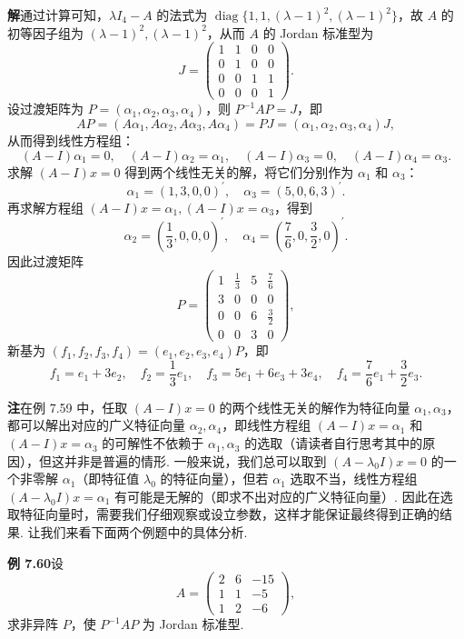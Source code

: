 \documentclass[UTF8, 12pt, fontset=fandol, oneside]{ctexart}
\begin{document}
\noindent\textbf{解}\quad 通过计算可知，$\lambda I_4-A$ 的法式为 $\operatorname{diag}\{1,1,(\lambda-1)^2,(\lambda-1)^2\}$，故 $A$ 的初等因子组为 $(\lambda-1)^2,(\lambda-1)^2$，从而 $A$ 的 Jordan 标准型为
\[
J=\left(\begin{array}{cccc}
1&1&0&0\\
0&1&0&0\\
0&0&1&1\\
0&0&0&1
\end{array}\right).
\]
设过渡矩阵为 $P=(\alpha_1,\alpha_2,\alpha_3,\alpha_4)$，则 $P^{-1}AP=J$，即
\[
AP=(A\alpha_1,A\alpha_2,A\alpha_3,A\alpha_4)=PJ=(\alpha_1,\alpha_2,\alpha_3,\alpha_4)J,
\]
从而得到线性方程组：
\[
(A-I)\alpha_1=0,\quad (A-I)\alpha_2=\alpha_1,\quad (A-I)\alpha_3=0,\quad (A-I)\alpha_4=\alpha_3.
\]
求解 $(A-I)x=0$ 得到两个线性无关的解，将它们分别作为 $\alpha_1$ 和 $\alpha_3$：
\[
\alpha_1=(1,3,0,0)^{\prime},\quad \alpha_3=(5,0,6,3)^{\prime}.
\]
再求解方程组 $(A-I)x=\alpha_1,(A-I)x=\alpha_3$，得到
\[
\alpha_2=\left(\frac13,0,0,0\right)^{\prime},\quad \alpha_4=\left(\frac76,0,\frac32,0\right)^{\prime}.
\]
因此过渡矩阵
\[
P=\left(\begin{array}{cccc}
1&\frac13&5&\frac76\\
3&0&0&0\\
0&0&6&\frac32\\
0&0&3&0
\end{array}\right),
\]
新基为 $(f_1,f_2,f_3,f_4)=(e_1,e_2,e_3,e_4)P$，即
\[
f_1=e_1+3e_2,\quad f_2=\frac13e_1,\quad f_3=5e_1+6e_3+3e_4,\quad f_4=\frac76e_1+\frac32e_3.
\]

\noindent\textbf{注}\quad 在例 7.59 中，任取 $(A-I)x=0$ 的两个线性无关的解作为特征向量 $\alpha_1,\alpha_3$，都可以解出对应的广义特征向量 $\alpha_2,\alpha_4$，即线性方程组 $(A-I)x=\alpha_1$ 和 $(A-I)x=\alpha_3$ 的可解性不依赖于 $\alpha_1,\alpha_3$ 的选取（请读者自行思考其中的原因），但这并非是普遍的情形. 一般来说，我们总可以取到 $(A-\lambda_0I)x=0$ 的一个非零解 $\alpha_1$（即特征值 $\lambda_0$ 的特征向量），但若 $\alpha_1$ 选取不当，线性方程组 $(A-\lambda_0I)x=\alpha_1$ 有可能是无解的（即求不出对应的广义特征向量）. 因此在选取特征向量时，需要我们仔细观察或设立参数，这样才能保证最终得到正确的结果. 让我们来看下面两个例题中的具体分析.

\noindent\textbf{例 7.60}\quad 设
\[
A=\left(\begin{array}{rrr}
2&6&-15\\
1&1&-5\\
1&2&-6
\end{array}\right),
\]
求非异阵 $P$，使 $P^{-1}AP$ 为 Jordan 标准型.
\end{document}
